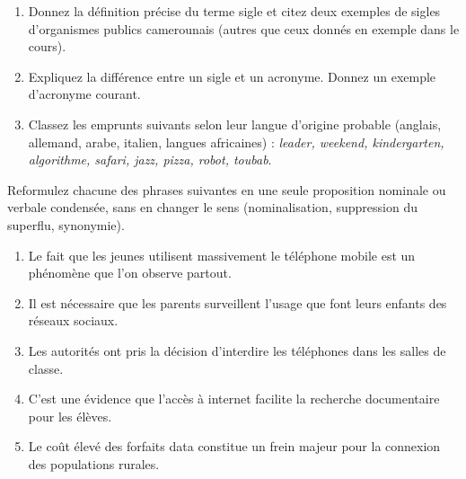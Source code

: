 \documentclass[11pt]{article}
\newcommand{\cle}[1]{{\popxbold\color{popdark}#1}}
\newcounter{popsec}
\newcounter{popsub}
\newcommand{\courssub}[1]{%
  \stepcounter{popsub}%
  \par\vspace{9pt}\noindent{\popxbold\fontsize{11.5}{13}\selectfont\color{popink}{\color{poporange}\thepopsec.\thepopsub}\hspace{6pt}#1}\par\nopagebreak\vspace{4pt}
}
\begin{document}
\begin{exercice}
\begin{enumerate}
\item Donnez la définition précise du terme \cle{sigle} et citez deux exemples de sigles d'organismes publics camerounais (autres que ceux donnés en exemple dans le cours).
\item Expliquez la différence entre un \cle{sigle} et un \cle{acronyme}. Donnez un exemple d'acronyme courant.
\item Classez les emprunts suivants selon leur langue d'origine probable (anglais, allemand, arabe, italien, langues africaines) : \emph{leader, weekend, kindergarten, algorithme, safari, jazz, pizza, robot, toubab}.
\end{enumerate}
\end{exercice}

\begin{exercice}
Reformulez chacune des phrases suivantes en une seule proposition nominale ou verbale condensée, sans en changer le sens (nominalisation, suppression du superflu, synonymie).

\begin{enumerate}
\item Le fait que les jeunes utilisent massivement le téléphone mobile est un phénomène que l'on observe partout.
\item Il est nécessaire que les parents surveillent l'usage que font leurs enfants des réseaux sociaux.
\item Les autorités ont pris la décision d'interdire les téléphones dans les salles de classe.
\item C'est une évidence que l'accès à internet facilite la recherche documentaire pour les élèves.
\item Le coût élevé des forfaits data constitue un frein majeur pour la connexion des populations rurales.
\end{enumerate}
\end{exercice}

\courssub{Je m'entraîne}
\end{document}
